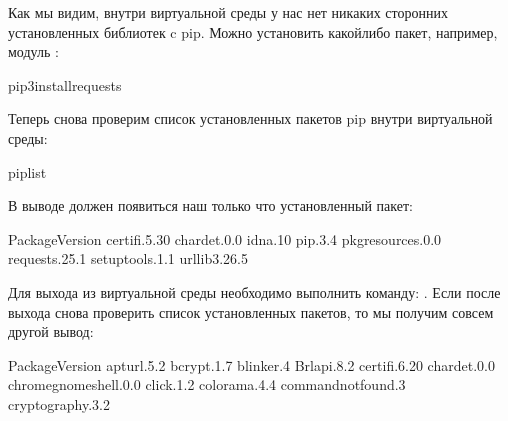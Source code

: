 \documentclass[letterpaper,10pt,russian]{sphinxmanual}
\begin{document}
\sphinxAtStartPar
Как мы видим, внутри виртуальной среды у нас нет никаких сторонних установленных библиотек c pip. Можно установить какой\sphinxhyphen{}либо пакет, например, модуль :

\begin{sphinxVerbatim}[commandchars=\\\{\}]
\PYGZdl{}pip3installrequests
\end{sphinxVerbatim}

\sphinxAtStartPar
Теперь снова проверим список установленных пакетов pip внутри виртуальной среды:

\begin{sphinxVerbatim}[commandchars=\\\{\}]
\PYGZdl{}piplist
\end{sphinxVerbatim}

\sphinxAtStartPar
В выводе должен появиться наш только что установленный пакет:

\begin{sphinxVerbatim}[commandchars=\\\{\}]
PackageVersion
\PYGZhy{}\PYGZhy{}\PYGZhy{}\PYGZhy{}\PYGZhy{}\PYGZhy{}\PYGZhy{}\PYGZhy{}\PYGZhy{}\PYGZhy{}\PYGZhy{}\PYGZhy{}\PYGZhy{}\PYGZhy{}\PYGZhy{}\PYGZhy{}\PYGZhy{}\PYGZhy{}\PYGZhy{}\PYGZhy{}\PYGZhy{}\PYGZhy{}
certifi.5.30
chardet.0.0
idna.10
pip.3.4
pkg\PYGZhy{}resources.0.0
requests.25.1
setuptools.1.1
urllib3.26.5
\end{sphinxVerbatim}

\sphinxAtStartPar
{}

\sphinxAtStartPar
Для выхода из виртуальной среды необходимо выполнить команду:
.
Если после выхода снова проверить список установленных пакетов, то мы получим совсем другой вывод:

\begin{sphinxVerbatim}[commandchars=\\\{\}]
PackageVersion
\PYGZhy{}\PYGZhy{}\PYGZhy{}\PYGZhy{}\PYGZhy{}\PYGZhy{}\PYGZhy{}\PYGZhy{}\PYGZhy{}\PYGZhy{}\PYGZhy{}\PYGZhy{}\PYGZhy{}\PYGZhy{}\PYGZhy{}\PYGZhy{}\PYGZhy{}\PYGZhy{}\PYGZhy{}\PYGZhy{}\PYGZhy{}\PYGZhy{}\PYGZhy{}\PYGZhy{}\PYGZhy{}\PYGZhy{}\PYGZhy{}\PYGZhy{}\PYGZhy{}\PYGZhy{}\PYGZhy{}\PYGZhy{}\PYGZhy{}\PYGZhy{}\PYGZhy{}
apturl.5.2
bcrypt.1.7
blinker.4
Brlapi.8.2
certifi.6.20
chardet.0.0
chrome\PYGZhy{}gnome\PYGZhy{}shell.0.0
click.1.2
colorama.4.4
command\PYGZhy{}not\PYGZhy{}found.3
cryptography.3.2
\end{sphinxVerbatim}
\end{document}
